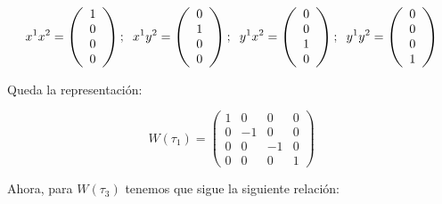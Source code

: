 \documentclass{article}
\begin{document}
\begin{enumerate}
\begin{enumerate}
        $$x^1x^2=\left( \begin{array}{c}
             1  \\
             0 \\
             0 \\
             0
        \end{array} \right ); \hspace{0.2cm} x^1y^2=\left( \begin{array}{c}
             0  \\
             1 \\
             0 \\
             0
        \end{array} \right ); \hspace{0.2cm} y^1x^2=\left( \begin{array}{c}
             0  \\
             0 \\
             1 \\
             0
        \end{array} \right ); \hspace{0.2cm} y^1y^2=\left( \begin{array}{c}
             0  \\
             0 \\
             0 \\
             1
        \end{array} \right )$$

        Queda la representación:

        $$W(\tau _1)=\left (\begin{array}{cccc}
           1  & 0 & 0 & 0 \\
           0  & -1 & 0 & 0 \\
             0 & 0 & -1 & 0 \\
             0 & 0 & 0 & 1
        \end{array} \right)$$

        Ahora, para $W(\tau _3)$ tenemos que sigue la siguiente relación:


\end{enumerate}
\end{enumerate}
\end{document}
